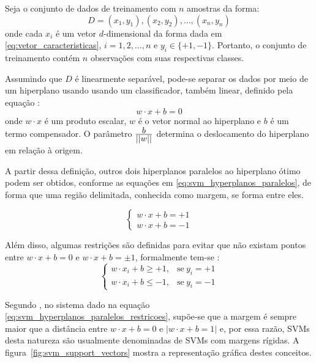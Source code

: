 Seja o conjunto de dados de treinamento com $n$ amostras da forma:
\begin{equation}
\label{eq:svm_dataset}
    D = (x_1, y_1), (x_2, y_2), \ldots, (x_n, y_n)
\end{equation}
\noindent onde cada $x_i$ é um vetor $d$-dimensional da forma dada em \ref{eq:vetor_caracteristicas}, $i = 1, 2, \ldots, n$ e $y_i \in \{+1, -1\}$. Portanto, o conjunto de treinamento contém $n$ observações com suas respectivas classes.

Assumindo que $D$ é linearmente separável, pode-se separar os dados por meio de um hiperplano usando usando um classificador, também linear, definido pela equação \citep{lorena:03}:
\begin{equation}
\label{eq:svm_hyperplano_otimo}
w \cdot x + b = 0
\end{equation}
\noindent onde $w \cdot x$ é um produto escalar, $w$ é o vetor normal ao hiperplano e $b$ é um termo compensador. O parâmetro $\frac{\displaystyle b}{\displaystyle ||w||}$ determina o deslocamento do hiperplano em relação à origem.

A partir dessa definição, outros dois hiperplanos paralelos ao hiperplano ótimo podem ser obtidos, conforme as equações em \ref{eq:svm_hyperplanos_paralelos}, de forma que uma região delimitada, conhecida como margem, se forma entre eles.

\begin{equation}
\label{eq:svm_hyperplanos_paralelos}
\begin{cases}
    w \cdot x + b = +1\\
    w \cdot x + b = -1
\end{cases}
\end{equation}

Além disso, algumas restrições são definidas para evitar que não existam pontos entre $w \cdot x + b = 0$ e $w \cdot x + b = \pm 1$, formalmente tem-se \citep{lorena:03}:
\begin{equation}
\label{eq:svm_hyperplanos_paralelos_restricoes}
\begin{cases}
    w \cdot x_i + b \geq +1, & \text{se}\ y_i = +1\\
    w \cdot x_i + b \leq -1, & \text{se}\ y_i = -1
\end{cases}
\end{equation}

Segundo \citet{campbell:00}, no sistema dado na equação \ref{eq:svm_hyperplanos_paralelos_restricoes}, supõe-se que a margem é sempre maior que a distância entre $w \cdot x + b = 0$ e $|w \cdot x + b = 1|$ e, por essa razão, SVMs desta natureza são usualmente denominadas de SVMs com margens rígidas. A figura~\ref{fig:svm_support_vectors} mostra a representação gráfica destes conceitos.


